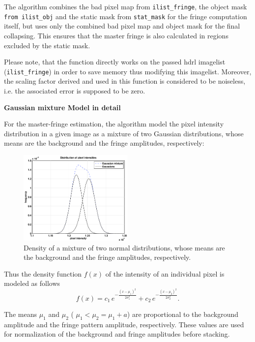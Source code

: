 The algorithm combines the bad pixel map from \verb,ilist_fringe,, the
object mask \verb,from ilist_obj, and the static mask from
\verb,stat_mask, for the fringe computation itself, but uses only the
combined bad pixel map and object mask for the final collapsing. This
ensures that the master fringe is also calculated in regions excluded
by the static mask.

Please note, that the function directly works on the passed hdrl
imagelist (\verb,ilist_fringe,) in order to save memory thus modifying
this imagelist. Moreover, the scaling factor derived and used in this
function is considered to be noiseless, i.e. the associated error is
supposed to be zero.


\quad \par{\bf Gaussian mixture Model in detail}

For the master-fringe estimation, the algorithm model the pixel
intensity distribution in a given image as a mixture of two Gaussian
distributions, whose means are the background and the fringe
amplitudes, respectively:

\begin{figure}[ht] 
\subfigure
\includegraphics[width=0.5\textwidth]{figures/gaussians.png}
\caption{Density of a mixture of two normal distributions, whose means
  are the background and the fringe amplitudes, respectively.  }
\label{fig:gaussian_mixture_model}
\end{figure}

Thus the density function $f(x)$ of the intensity of an individual
pixel is modeled as follows
\begin{equation}
  f(x) = c_1\,e^{ -\frac{(x-\mu_1)^2}{2\sigma_1^2} }
  + c_2\,e^{ -\frac{(x-\mu_2)^2}{2\sigma_2^2} }.
\end{equation}

The means $\mu_1$ and $\mu_2$ ( $\mu_1 < \mu_2 = \mu_{1}+a$) are
proportional to the background amplitude and the fringe pattern
amplitude, respectively.  These values are used for normalization of
the background and fringe amplitudes before stacking.

